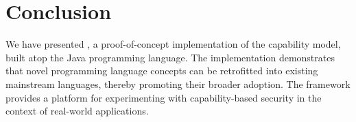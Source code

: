 \section{Conclusion}

We have presented \jdala, a proof-of-concept implementation of the \dala capability model, built atop the Java programming language.
The implementation demonstrates that novel programming language concepts can be retrofitted into existing mainstream languages, thereby promoting their broader adoption. The \jdala framework provides a platform for experimenting with capability-based security in the context of real-world applications.

 